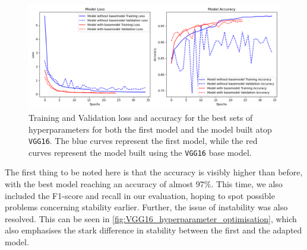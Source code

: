\begin{table}[H]
    \centering
    \caption{The six combinations of hyperparameters for the second approach using the \texttt{VGG16} base model with their respective metrics.}
    \label{tab:VGG16_hyperparameter_optimisation}
\end{table}
\begin{figure}[H]
    \centering
    \includegraphics[width=\textwidth]{images/VGG16_best_parameters_comparison.png}
    \caption{Training and Validation loss and accuracy for the best sets of hyperparameters for both the first model and the model built atop \texttt{VGG16}.
    The blue curves represent the first model, while the red curves represent the model built using the \texttt{VGG16} base model.}
    \label{fig:VGG16_hyperparameter_optimisation}
\end{figure}

The first thing to be noted here is that the accuracy is visibly higher than before, with the best model reaching an accuracy of almost $97 \%$.
This time, we also included the F1-score and recall in our evaluation, hoping to spot possible problems concerning stability earlier.
Further, the issue of instability was also resolved.
This can be seen in \autoref{fig:VGG16_hyperparameter_optimisation}, which also emphasises the stark difference in stability between the first and the adapted model.

